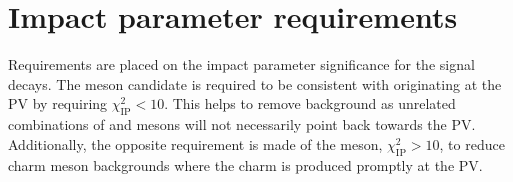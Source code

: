 \section{Impact parameter requirements}
\label{sec:app_sel_IPchi2}

Requirements are placed on the impact parameter significance for the signal decays. The \Bp meson candidate is required to be consistent with originating at the PV by requiring $\chi^2_{\text{IP}} < 10$. This helps to remove background as unrelated combinations of \Dsp and \phiz mesons will not necessarily point back towards the PV.
Additionally, the opposite requirement is made of the \Dsp meson, $\chi^2_{\text{IP}} > 10$, to reduce charm meson backgrounds where the charm is produced promptly at the PV.


